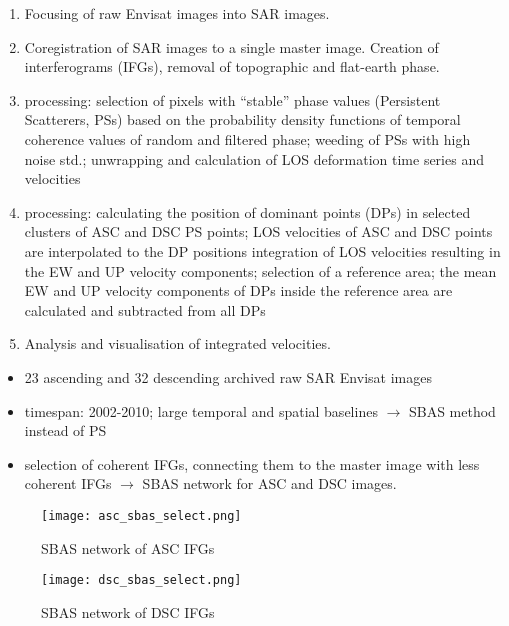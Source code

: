 \documentclass[a0, portrait]{a0poster}
\begin{document}
\begin{multicols}{2}
\begin{enumerate}
    \item Focusing of raw Envisat images into SAR images.
    \item Coregistration of SAR images to a single master image. Creation of interferograms (IFGs), removal of topographic and flat-earth phase.
    \item \stamps \cite{Hooper2008} processing: selection of pixels with ``stable'' phase values (Persistent Scatterers, PSs) based on the probability density functions of temporal coherence values of random and filtered phase; weeding of PSs with high noise std.; unwrapping and calculation of LOS deformation time series and velocities
    \item \daisy processing: calculating the position of dominant points (DPs) in selected clusters of ASC and DSC PS points; LOS velocities of ASC and DSC points are interpolated to the DP positions integration of LOS velocities resulting in the EW and UP velocity components; selection of a reference area; the mean EW and UP velocity components of DPs inside the reference area are calculated and subtracted from all DPs
    \item Analysis and visualisation of integrated velocities.
\end{enumerate}



\begin{itemize}
    \item 23 ascending and 32 descending archived raw SAR Envisat images
    \item timespan: 2002-2010; large temporal and spatial baselines $\rightarrow$ SBAS method instead of PS
    \item selection of coherent IFGs, connecting them to the master image with less coherent IFGs $\rightarrow$ SBAS network for ASC and DSC images.
\end{itemize}

\begin{figure}[H]
    \begin{minipage}[t]{0.25\textwidth}
        \centering
        \texttt{[image: asc\_sbas\_select.png]}
        \caption{SBAS network of ASC IFGs}
    \end{minipage}
    \begin{minipage}[t]{0.25\textwidth}
        \centering
        \texttt{[image: dsc\_sbas\_select.png]}
        \caption{SBAS network of DSC IFGs}
    \end{minipage}
\end{figure}


\end{multicols}
\end{document}
